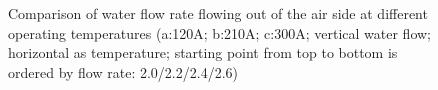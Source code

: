 \begin{figure}
	\label{fig:figure4}

	\caption{Comparison of water flow rate flowing out of the air side at different operating temperatures (a:120A; b:210A; c:300A; vertical water flow; horizontal as temperature; starting point from top to bottom is ordered by flow rate: 2.0/2.2/2.4/2.6)}
\end{figure}


